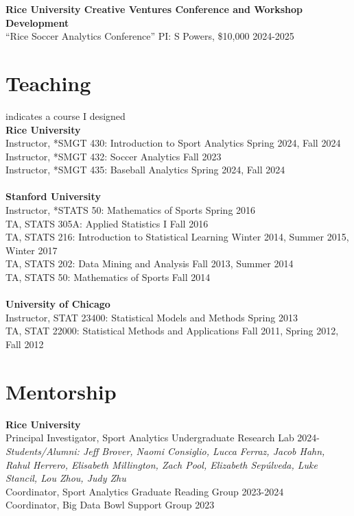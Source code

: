 \documentclass{article}
\begin{document}
{\bf Rice University Creative Ventures Conference and Workshop Development}\\
``Rice Soccer Analytics Conference'' PI: S Powers, \$10,000 \hfill 2024-2025


\section*{\sc Teaching}

\vspace{-4mm}\hfill * indicates a course I designed\\
{\bf Rice University}\\
Instructor, *SMGT 430: Introduction to Sport Analytics \hfill Spring 2024, Fall 2024\\
Instructor, *SMGT 432: Soccer Analytics \hfill Fall 2023\\
Instructor, *SMGT 435: Baseball Analytics \hfill Spring 2024, Fall 2024\\
~\\
{\bf Stanford University}\\
Instructor, *STATS 50: Mathematics of Sports \hspace{5mm} \hfill Spring 2016\\
TA, STATS 305A: Applied Statistics I \hfill Fall 2016\\
TA, STATS 216: Introduction to Statistical Learning \hfill Winter 2014, Summer 2015, Winter 2017\\
TA, STATS 202: Data Mining and Analysis \hfill Fall 2013, Summer 2014\\
TA, STATS 50: Mathematics of Sports \hfill Fall 2014\\
~\\
{\bf University of Chicago}\\
Instructor, STAT 23400: Statistical Models and Methods \hfill Spring 2013\\
TA, STAT 22000: Statistical Methods and Applications \hfill Fall 2011, Spring 2012, Fall 2012


\section*{\sc Mentorship}

{\bf Rice University}\\
Principal Investigator, Sport Analytics Undergraduate Research Lab \hfill 2024-\\
{\it Students/Alumni: Jeff Brover, Naomi Consiglio, Lucca Ferraz, Jacob Hahn, Rahul Herrero, Elisabeth Millington, Zach Pool, Elizabeth Sep\'ulveda, Luke Stancil, Lou Zhou, Judy Zhu}\\
Coordinator, Sport Analytics Graduate Reading Group \hfill 2023-2024\\
Coordinator, Big Data Bowl Support Group \hfill 2023
\end{document}

